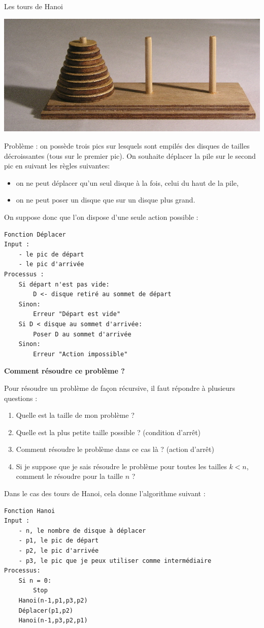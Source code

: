 \documentclass{../cours}
\begin{document}
\begin{Example}
Les tours de Hanoi

\includegraphics[scale=0.5]{hanoi.jpg}

Problème : on possède trois pics sur lesquels sont empilés des disques de tailles décroissantes (tous sur le premier pic). On souhaite déplacer la pile sur le second pic en suivant les règles suivantes:
\begin{itemize}
\item on ne peut déplacer qu'un seul disque à la fois, celui du haut de la pile,
\item on ne peut poser un disque que sur un disque plus grand.
\end{itemize}

On suppose donc que l'on dispose d'une seule action possible :
\begin{lstlisting}
Fonction Déplacer
Input : 
    - le pic de départ
    - le pic d'arrivée
Processus :
    Si départ n'est pas vide:
        D <- disque retiré au sommet de départ
    Sinon:
        Erreur "Départ est vide"
    Si D < disque au sommet d'arrivée:
        Poser D au sommet d'arrivée
    Sinon:
        Erreur "Action impossible"
\end{lstlisting}
\textbf{Comment résoudre ce problème ?}

Pour résoudre un problème de façon récursive, il faut répondre à plusieurs questions :

\begin{enumerate}
\item Quelle est la taille de mon problème ?
\item Quelle est la plus petite taille possible ? (condition d'arrêt)
\item Comment résoudre le problème dans ce cas là ? (action d'arrêt)
\item Si je suppose que je sais résoudre le problème pour toutes les tailles $k < n$, comment le résoudre pour la taille $n$ ?
\end{enumerate}

Dans le cas des tours de Hanoi, cela donne l'algorithme suivant :

\begin{lstlisting}
Fonction Hanoi
Input :
    - n, le nombre de disque à déplacer
    - p1, le pic de départ
    - p2, le pic d'arrivée
    - p3, le pic que je peux utiliser comme intermédiaire
Processus:
    Si n = 0:
        Stop
    Hanoi(n-1,p1,p3,p2)
    Déplacer(p1,p2)
    Hanoi(n-1,p3,p2,p1)
\end{lstlisting}
\end{Example}
\end{document}
